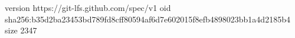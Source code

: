 version https://git-lfs.github.com/spec/v1
oid sha256:b35d2ba23453bd789fd8cff80594af6d7e602015f8efb4898023bb1a4d2185b4
size 2347
